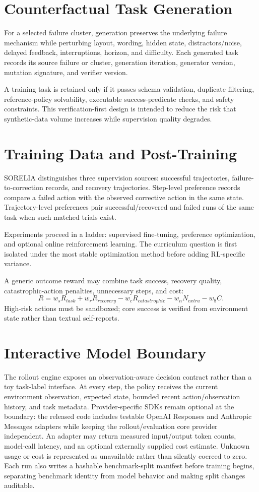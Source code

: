 \documentclass{article}
\begin{document}
\section{Counterfactual Task Generation}
For a selected failure cluster, generation preserves the underlying failure mechanism while perturbing layout, wording, hidden state, distractors/noise, delayed feedback, interruptions, horizon, and difficulty. Each generated task records its source failure or cluster, generation iteration, generator version, mutation signature, and verifier version.

A training task is retained only if it passes schema validation, duplicate filtering, reference-policy solvability, executable success-predicate checks, and safety constraints. This verification-first design is intended to reduce the risk that synthetic-data volume increases while supervision quality degrades.

\section{Training Data and Post-Training}
SORELIA distinguishes three supervision sources: successful trajectories, failure-to-correction records, and recovery trajectories. Step-level preference records compare a failed action with the observed corrective action in the same state. Trajectory-level preferences pair successful/recovered and failed runs of the same task when such matched trials exist.

Experiments proceed in a ladder: supervised fine-tuning, preference optimization, and optional online reinforcement learning. The curriculum question is first isolated under the most stable optimization method before adding RL-specific variance.

A generic outcome reward may combine task success, recovery quality, catastrophic-action penalties, unnecessary steps, and cost:
\[
R = w_s R_{task}+w_r R_{recovery}-w_c R_{catastrophic}-w_n N_{extra}-w_\$ C.
\]
High-risk actions must be sandboxed; core success is verified from environment state rather than textual self-reports.

\section{Interactive Model Boundary}
The rollout engine exposes an observation-aware decision contract rather than a toy task-label interface. At every step, the policy receives the current environment observation, expected state, bounded recent action/observation history, and task metadata. Provider-specific SDKs remain optional at the boundary: the released code includes testable OpenAI Responses and Anthropic Messages adapters while keeping the rollout/evaluation core provider independent. An adapter may return measured input/output token counts, model-call latency, and an optional externally supplied cost estimate. Unknown usage or cost is represented as unavailable rather than silently coerced to zero. Each run also writes a hashable benchmark-split manifest before training begins, separating benchmark identity from model behavior and making split changes auditable.
\end{document}
